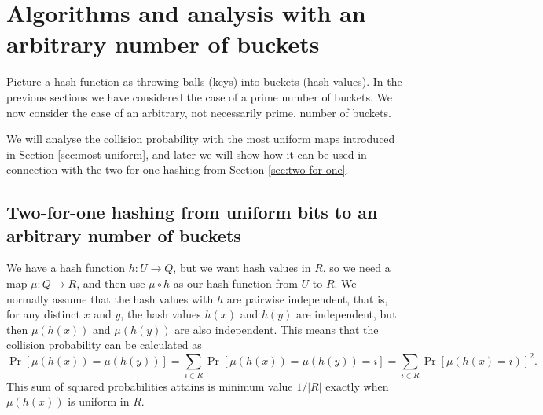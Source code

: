 
\section{Algorithms and analysis with an arbitrary number of buckets}\label{sec:arbitrary-buckets}

Picture a hash function as throwing balls (keys) into buckets (hash values).
In the previous sections we have considered the case of a prime number of buckets.
We now consider the case of an arbitrary, not necessarily prime, number of buckets.

We will analyse the collision probability with the most uniform maps introduced in Section \ref{sec:most-uniform}, and later we will show how it can be used in connection with the two-for-one hashing from Section \ref{sec:two-for-one}.

\subsection{Two-for-one hashing from uniform bits to an arbitrary number of buckets}
We have a hash function $h:U\to Q$, but we want hash values in $R$, so we need a map $\mu:Q\to R$, and then use $\mu\circ h$ as our hash function from $U$ to $R$.
We normally assume that the hash values with $h$ are pairwise independent, that is, for any distinct $x$ and $y$, the hash values $h(x)$ and $h(y)$ are independent, but then $\mu(h(x))$ and $\mu(h(y))$ are also independent.
This means that the collision probability can be calculated as \[\Pr[\mu(h(x))=\mu(h(y))]=\sum_{i\in R}\Pr[\mu(h(x))=\mu(h(y))=i]=\sum_{i\in R}\Pr[\mu(h(x)=i)]^2.
\]
This sum of squared probabilities attains is minimum value $1/|R|$
exactly when $\mu(h(x))$ is uniform in $R$.

